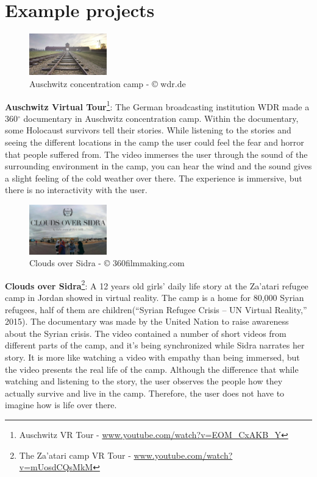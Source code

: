 \section{Example projects}

\begin{figure}
    \centering
    \includegraphics[width=0.30\textwidth]{images/Auschwitz2.png}
    \caption{Auschwitz concentration camp - © wdr.de}
    \label{fig:awsch}
\end{figure}
\textbf{Auschwitz Virtual Tour}\footnote{Auschwitz VR Tour - \url{www.youtube.com/watch?v=EOM_CxAKB_Y}}: The German broadcasting institution WDR made a 360$^{\circ}$ documentary in Auschwitz concentration camp. Within the documentary, some Holocaust survivors tell their stories. While listening to the stories and seeing the different locations in the camp the user could feel the fear and horror that people suffered from. The video immerses the user through the sound of the surrounding environment in the camp, you can hear the wind and the sound gives a slight feeling of the cold weather over there. The experience is immersive, but there is no interactivity with the user.

\begin{figure}
    \centering
    \includegraphics[width=0.30\textwidth]{images/clouds.png}
    \caption{Clouds over Sidra - © 360filmmaking.com}
    \label{fig:sidra}
\end{figure}

\textbf{Clouds over Sidra}\footnote{The Za’atari camp VR Tour - \url{www.youtube.com/watch?v=mUosdCQsMkM}}: A 12 years old girls’ daily life story at the Za’atari refugee camp in Jordan
showed in virtual reality. The camp is a home for 80,000 Syrian refugees, half of them are
children(“Syrian Refugee Crisis – UN Virtual Reality,” 2015). The documentary was made by
the United Nation to raise awareness about the Syrian crisis. The video contained a number
of short videos from different parts of the camp, and it’s being synchronized while Sidra
narrates her story.
It is more like watching a video with empathy than being immersed, but
the video presents the real life of the camp. Although the difference that while watching and
listening to the story, the user observes the people how they actually survive and live in the
camp. Therefore, the user does not have to imagine how is life over there.




